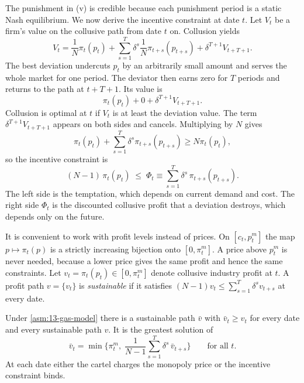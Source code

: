 The punishment in (v) is credible because each punishment period is a static Nash equilibrium. We now derive
the incentive constraint at date $t$. Let $V_t$ be a firm's value on the collusive path from date $t$ on.
Collusion yields
\begin{equation*}
V_t=\frac{1}{N}\pi_t(p_t)+\sum_{s=1}^{T}\delta^s\frac{1}{N}\pi_{t+s}(p_{t+s})+\delta^{T+1}V_{t+T+1}.
\end{equation*}
The best deviation undercuts $p_t$ by an arbitrarily small amount and serves the whole market for one
period. The deviator then earns zero for $T$ periods and returns to the path at $t+T+1$. Its value is
\begin{equation*}
\pi_t(p_t)+0+\delta^{T+1}V_{t+T+1}.
\end{equation*}
Collusion is optimal at $t$ if $V_t$ is at least the deviation value. The term $\delta^{T+1}V_{t+T+1}$
appears on both sides and cancels. Multiplying by $N$ gives
\begin{equation*}
\pi_t(p_t)+\sum_{s=1}^{T}\delta^s\pi_{t+s}(p_{t+s})\ge N\pi_t(p_t),
\end{equation*}
so the incentive constraint is
\begin{equation}\label{eq:13-gas-ic}
(N-1)\,\pi_t(p_t)\;\le\;\Phi_t\equiv\sum_{s=1}^{T}\delta^s\,\pi_{t+s}(p_{t+s}).
\end{equation}
The left side is the temptation, which depends on current demand and cost. The right side $\Phi_t$ is the
discounted collusive profit that a deviation destroys, which depends only on the future.

It is convenient to work with profit levels instead of prices. On $[c_t,p^m_t]$ the map
$p\mapsto\pi_t(p)$ is a strictly increasing bijection onto $[0,\pi^m_t]$. A price above $p^m_t$ is never
needed, because a lower price gives the same profit and hence the same constraints. Let
$v_t=\pi_t(p_t)\in[0,\pi^m_t]$ denote collusive industry profit at $t$. A profit path $v=\{v_t\}$ is
\emph{sustainable} if it satisfies $(N-1)v_t\le\sum_{s=1}^{T}\delta^s v_{t+s}$ at every date.

\begin{lemma}\label{lem:13-gas-greatest}
Under \cref{asm:13-gas-model} there is a sustainable path $\bar v$ with $\bar v_t\ge v_t$ for every date and
every sustainable path $v$. It is the greatest solution of
\begin{equation}\label{eq:13-gas-fixed}
\bar v_t=\min\Big\{\pi^m_t,\;\frac{1}{N-1}\sum_{s=1}^{T}\delta^s\,\bar v_{t+s}\Big\}\qquad\text{for all }t.
\end{equation}
At each date either the cartel charges the monopoly price or the incentive constraint binds.
\end{lemma}

